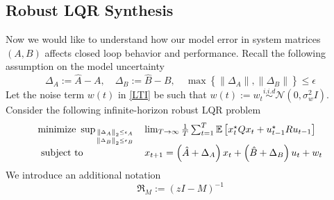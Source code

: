 \documentclass{article}[12pt]
\begin{document}
\subsection{Robust LQR Synthesis}
Now we would like to understand how our model error in system matrices $(A,B)$ affects closed loop behavior and performance. Recall the following assumption on the model uncertainty
\begin{equation}
\label{uncertainty}
\Delta_{A}:=\widehat{A}-A, \quad \Delta_{B}:=\widehat{B}-B, \quad \max \left\{\left\|\Delta_{A}\right\|,\left\|\Delta_{B}\right\|\right\} \leq \epsilon
\end{equation}
Let the noise term $w(t)$ in \eqref{LTI} be such that $w(t) := w_t \stackrel{i . i . d}{\sim} \mathcal{N}\left(0, \sigma_{w}^{2} I\right)$.
Consider the following infinite-horizon robust LQR problem
\begin{equation}
\label{robust_LQR}
\begin{aligned}
    \begin{array}{ll}{\operatorname{minimize} \ \sup _{\left\|\Delta_{A}\right\|_{2} \leq \epsilon_{A} \atop\left\|\Delta_{B}\right\|_{2} \leq \epsilon_{B}}}
    &{\lim_{T \rightarrow \infty} \frac{1}{T} \sum_{t=1}^{T} \mathbb{E}\left[x_{t}^{\star} Q x_{t}+u_{t-1}^{\star} R u_{t-1}\right]
    } \\
    {\text { subject to }} & {x_{t+1}=\left(\hat{A}+\Delta_{A}\right) x_{t}+\left(\hat{B}+\Delta_{B}\right) u_{t}+w_{t}}\end{array}
\end{aligned}
\end{equation}
We introduce an additional notation
\begin{equation}
    \mathfrak{R}_{M}:=(z I-M)^{-1}
\end{equation}
\end{document}
